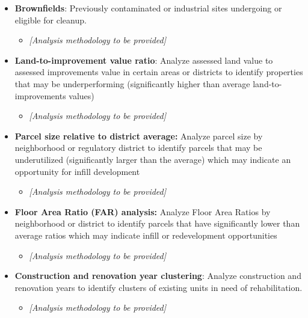 \documentclass[
  letterpaper,
  DIV=11,
  numbers=noendperiod]{scrreprt}
\providecommand{\tightlist}{%
  \setlength{\itemsep}{0pt}\setlength{\parskip}{0pt}}
\begin{document}
\begin{itemize}
\tightlist
\item
  \textbf{Brownfields}: Previously contaminated or industrial sites
  undergoing or eligible for cleanup.

  \begin{itemize}
  \tightlist
  \item
    \emph{{[}Analysis methodology to be provided{]}}
  \end{itemize}
\item
  \textbf{Land-to-improvement value ratio}: Analyze assessed land value
  to assessed improvements value in certain areas or districts to
  identify properties that may be underperforming (significantly higher
  than average land-to-improvements values)

  \begin{itemize}
  \tightlist
  \item
    \emph{{[}Analysis methodology to be provided{]}}
  \end{itemize}
\item
  \textbf{Parcel size relative to district average:} Analyze parcel size
  by neighborhood or regulatory district to identify parcels that may be
  underutilized (significantly larger than the average) which may
  indicate an opportunity for infill development

  \begin{itemize}
  \tightlist
  \item
    \emph{{[}Analysis methodology to be provided{]}}
  \end{itemize}
\item
  \textbf{Floor Area Ratio (FAR) analysis:} Analyze Floor Area Ratios by
  neighborhood or district to identify parcels that have significantly
  lower than average ratios which may indicate infill or redevelopment
  opportunities

  \begin{itemize}
  \tightlist
  \item
    \emph{{[}Analysis methodology to be provided{]}}
  \end{itemize}
\item
  \textbf{Construction and renovation year clustering}: Analyze
  construction and renovation years to identify clusters of existing
  units in need of rehabilitation.

  \begin{itemize}
  \tightlist
  \item
    \emph{{[}Analysis methodology to be provided{]}}
  \end{itemize}
\end{itemize}
\end{document}
